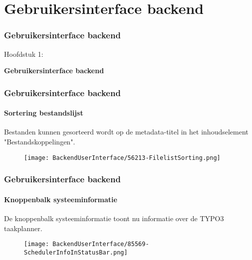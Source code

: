 %

\section{Gebruikersinterface backend}
\begin{frame}[fragile]
	\frametitle{Gebruikersinterface backend}

	\begin{center}\huge{Hoofdstuk 1:}\end{center}
	\begin{center}\huge{\color{typo3darkgrey}\textbf{Gebruikersinterface backend}}\end{center}

\end{frame}


\begin{frame}[fragile]
	\frametitle{Gebruikersinterface backend}
	\framesubtitle{Sortering bestandslijst}

	Bestanden kunnen gesorteerd wordt op de metadata-titel in het inhoudselement "Bestandskoppelingen".

	\begin{figure}
		\texttt{[image: BackendUserInterface/56213-FilelistSorting.png]}
	\end{figure}

\end{frame}


\begin{frame}[fragile]
	\frametitle{Gebruikersinterface backend}
	\framesubtitle{Knoppenbalk systeeminformatie}

	De knoppenbalk systeeminformatie toont nu informatie over de TYPO3 taakplanner.

	\begin{figure}
		\texttt{[image: BackendUserInterface/85569-SchedulerInfoInStatusBar.png]}
	\end{figure}

\end{frame}

